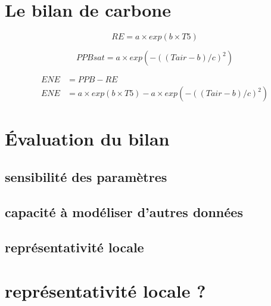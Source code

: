 \section{Le bilan de carbone}

\begin{equation}
RE = a \times exp(b\times T5)
\end{equation}

\begin{equation}
PPBsat = a \times exp(-((Tair - b)/ c)^2)
\end{equation}

\begin{align}
ENE &= PPB - RE\\
ENE &= a \times exp(b\times T5) - a \times exp(-((Tair - b)/ c)^2)
\end{align}
\section{Évaluation du bilan}

\subsection{sensibilité des paramètres}

\subsection{capacité à modéliser d'autres données}

\subsection{représentativité locale}

\section{représentativité locale ?}